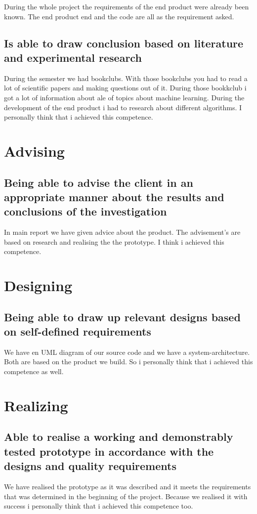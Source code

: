 \documentclass{article}
\begin{document}
During the whole project the requirements of the end product were already been known. The end product end and the code are all as the requirement asked.

\subsection{Is able to draw conclusion based on literature and experimental research}
During the semester we had bookclubs. With those bookclubs you had to read a lot of scientific papers and making questions out of it. During those bookkclub i got a lot of information about ale of topics about machine learning. During the development of the end product i had to research about different algorithms.
I personally think that i achieved this competence.


\section{Advising}

\subsection{Being able to advise the client in an appropriate manner about the results and
conclusions of the investigation}

In main report we have given advice about the product. The advisement's are based on research and realising the the prototype. I think i achieved this competence.

\section{Designing}

\subsection{Being able to draw up relevant designs based on self-defined requirements}

We have en UML diagram of our source code and we have a system-architecture. Both are based on the product we build. So i personally think that i achieved this competence as well.

\section{Realizing}

\subsection{Able to realise a working and demonstrably tested prototype in
accordance with the designs and quality requirements}
 We have realised the prototype as it was described and it meets the requirements that was determined in the beginning of the project. Because we realised it with success i personally think that i achieved this competence too.
\end{document}
